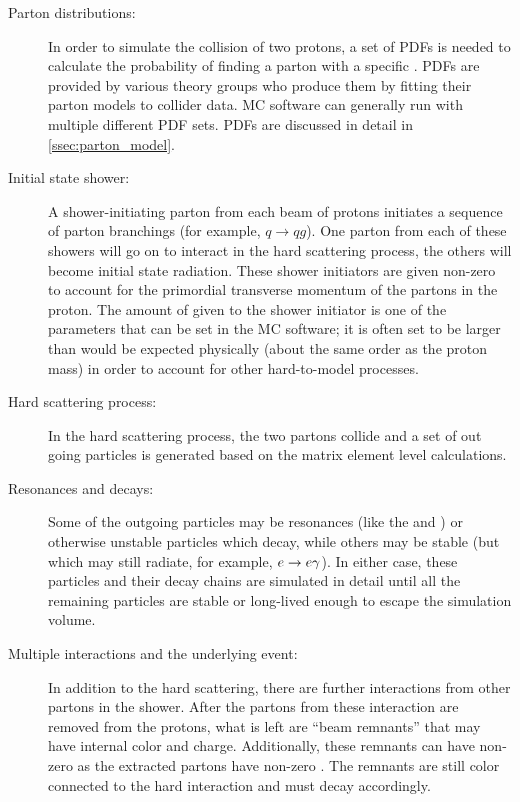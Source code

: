 \begin{description}

    \item[Parton distributions:] In order to simulate the collision of two
        protons, a set of PDFs is needed to calculate the probability of
        finding a parton with a specific . PDFs are provided by
        various theory groups who produce them by fitting their parton models
        to collider data. MC software can generally run with multiple different
        PDF sets. PDFs are discussed in detail in \cref{ssec:parton_model}.

    \item[Initial state shower:] A shower-initiating parton from each beam of
        protons initiates a sequence of parton branchings (for example, $q \to
        qg$). One parton from each of these showers will go on to interact in
        the hard scattering process, the others will become initial state
        radiation. These shower initiators are given non-zero \pt to account
        for the primordial transverse momentum of the partons in the proton.
        The amount of \pt given to the shower initiator is one of the
        parameters that can be set in the MC software; it is often set to be
        larger than would be expected physically (about the same order as the
        proton mass) in order to account for other hard-to-model processes.

    \item[Hard scattering process:] In the hard scattering process, the two
        partons collide and a set of out going particles is generated based on
        the matrix element level calculations.

    \item[Resonances and decays:] Some of the outgoing particles may be
        resonances (like the \W and \Z) or otherwise unstable particles which
        decay, while others may be stable (but which may still radiate, for
        example, $e \to e \gamma$). In either case, these particles and their
        decay chains are simulated in detail until all the remaining particles
        are stable or long-lived enough to escape the simulation volume.

    \item[Multiple interactions and the underlying event:] In addition to the
        hard scattering, there are further interactions from other partons in
        the shower. After the partons from these interaction are removed from
        the protons, what is left are ``beam remnants'' that may have internal
        color and charge. Additionally, these remnants can have non-zero \pt as
        the extracted partons have non-zero \pt. The remnants are still color
        connected to the hard interaction and must decay accordingly.


\end{description}
